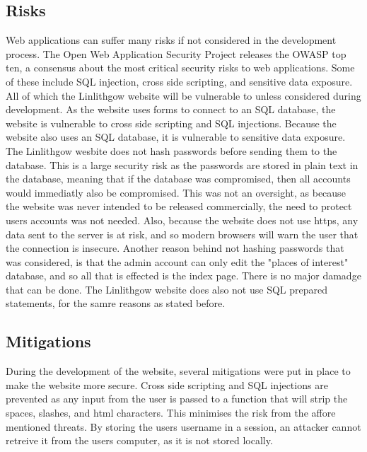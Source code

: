 \documentclass[12pt,a4paper]{article}
\begin{document}
		\subsection{Risks}
		Web applications can suffer many risks if not considered in the development process. The Open Web Application Security Project releases the OWASP top ten, a consensus about the most critical security risks to web applications. Some of these include SQL injection, cross side scripting, and sensitive data exposure. All of which the Linlithgow website will be vulnerable to unless considered during development. As the website uses forms to connect to an SQL database, the website is vulnerable to cross side scripting and SQL injections. Because the website also uses an SQL database, it is vulnerable to sensitive data exposure. The Linlithgow wesbite does not hash passwords before sending them to the database. This is a large security risk as the passwords are stored in plain text in the database, meaning that if the database was compromised, then all accounts would immediatly also be compromised. This was not an oversight, as because the website was never intended to be released commercially, the need to protect users accounts was not needed. Also, because the website does not use https, any data sent to the server is at risk, and so modern browsers will warn the user that the connection is insecure. Another reason behind not hashing passwords that was considered, is that the admin account can only edit the "places of interest" database, and so all that is effected is the index page. There is no major damadge that can be done. The Linlithgow website does also not use SQL prepared statements, for the samre reasons as stated before.

		\subsection{Mitigations}
		During the development of the website, several mitigations were put in place to make the website more secure. Cross side scripting and SQL injections are prevented as any input from the user is passed to a function that will strip the spaces, slashes, and html characters. This minimises the risk from the affore mentioned threats. By storing the users username in a session, an attacker cannot retreive it from the users computer, as it is not stored locally.

	\clearpage
\end{document}
